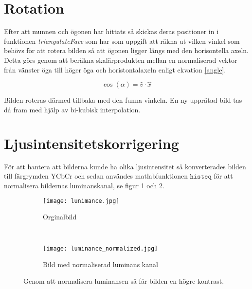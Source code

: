 \documentclass[a4paper,12pt,oneside,final]{extbook}
\begin{document}
\section{Rotation}

Efter att munnen och ögonen har hittats så skickas deras positioner in i funktionen \textit{triangulateFace} som har som uppgift att räkna ut vilken vinkel som behövs för att rotera bilden så att ögonen ligger längs med den horisontella axeln. Detta görs genom att beräkna skalärprodukten mellan en normaliserad vektor från vänster öga till höger öga och horistontalaxeln enligt ekvation \ref{angle}.

\begin{equation} \label{angle}
\cos(\alpha) = \widehat{v} \cdot \widehat{x}
\end{equation}



Bilden roteras därmed tillbaka med den funna vinkeln. En ny upprätad bild tas då fram med hjälp av bi-kubisk interpolation. 

\section{Ljusintensitetskorrigering}

För att hantera att bilderna kunde ha olika ljusintensitet så konverterades bilden till färgrymden YCbCr och sedan användes matlabfunktionen $\mathtt{histeq}$ för att normalisera bildernas luminanskanal, se figur \ref{fig:luminanceSub} och \ref{fig:luminanceNormal}. 

\begin{figure}[h]
  \centering

   \begin{subfigure}[b]{0.4\textwidth}
        \texttt{[image: lunimance.jpg]}
        \caption{Orginalbild}
        \label{fig:luminanceSub}
    \end{subfigure}
    ~ %
     \begin{subfigure}[b]{0.4\textwidth}
        \texttt{[image: luminance\_normalized.jpg]}
        \caption{Bild med normaliserad luminans kanal}
        \label{fig:luminanceNormal}
    \end{subfigure}
    
    
    \caption{Genom att normalisera luminansen så får bilden en högre kontrast.}
    \label{fig:luminance}
\end{figure}
\end{document}
